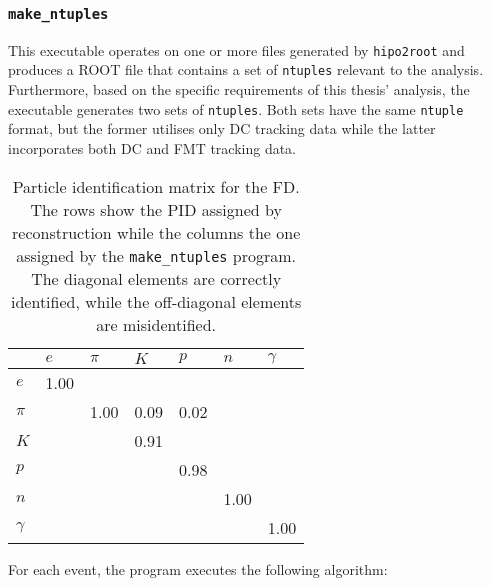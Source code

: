 \subsubsection{\texttt{make\_ntuples}}
\label{13.14::make_ntuples}
    This executable operates on one or more files generated by \texttt{hipo2root} and produces a ROOT file that contains a set of \texttt{ntuples} relevant to the analysis.
    Furthermore, based on the specific requirements of this thesis' analysis, the executable generates two sets of \texttt{ntuples}.
    Both sets have the same \texttt{ntuple} format, but the former utilises only DC tracking data while the latter incorporates both DC and FMT tracking data.

    \begin{table}
        \caption{Particle identification matrix for the FD.
        The rows show the PID assigned by reconstruction while the columns the one assigned by the \texttt{make\_ntuples} program.
        The diagonal elements are correctly identified, while the off-diagonal elements are misidentified.}

        \begin{center}
            \begin{tabularx}{240pt}{X|llllll}
                \cline{2-7}
                         & $e$      & $\pi$ & $K$  & $p$  & $n$  & $\gamma$ \\
                \hline
                $e$      & 1.00     &       &      &      &      &          \\
                $\pi$    &          & 1.00  & 0.09 & 0.02 &      &          \\
                $K$      &          &       & 0.91 &      &      &          \\
                $p$      &          &       &      & 0.98 &      &          \\
                $n$      &          &       &      &      & 1.00 &          \\
                $\gamma$ &          &       &      &      &      & 1.00     \\
                \hline
            \end{tabularx}
        \end{center}
        \label{tab::13.14::make_ntuples_pid}
    \end{table}

    For each event, the program executes the following algorithm:

